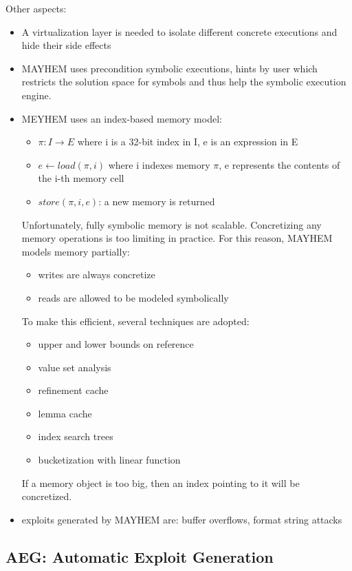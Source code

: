\documentclass[10pt, a4paper]{article}
\begin{document}
Other aspects:
\begin{itemize}
  \item A virtualization layer is needed to isolate different concrete executions and hide their side effects
  \item MAYHEM uses precondition symbolic executions, hints by user which restricts the solution space for symbols and thus help the symbolic execution engine.
  \item MEYHEM uses an index-based memory model:
    \begin{itemize}
      \item $\pi : I \to E$ where i is a 32-bit index in I, e is an expression in E 
      \item $e \gets load(\pi, i)$ where i indexes memory $\pi$, e represents the contents of the i-th memory cell
      \item $store(\pi, i, e)$: a new memory is returned
    \end{itemize}
    Unfortunately, fully symbolic memory is not scalable. Concretizing any memory operations is too limiting in practice. For this reason, MAYHEM models memory partially:
    \begin{itemize}
      \item writes are always concretize
      \item reads are allowed to be modeled symbolically
    \end{itemize}
    To make this efficient, several techniques are adopted: 
    \begin{itemize}
      \item upper and lower bounds on reference
      \item value set analysis
      \item refinement cache
      \item lemma cache
      \item index search trees
      \item bucketization with linear function
    \end{itemize}
    If a memory object is too big, then an index pointing to it will be concretized.
  \item exploits generated by MAYHEM are: buffer overflows, format string attacks
\end{itemize}

\subsection{\cite{AEG-NDSS11} AEG: Automatic Exploit Generation} 
\end{document}
